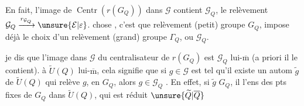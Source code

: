 En fait, l'image de $\operatorname{Centr}(r(G_Q))$ dans $\mathcal G$ contient $\mathcal G_Q$,    le relèvement $\mathcal G_Q\xrightarrow{r_{\mathcal G_Q}}\unsure{\mathcal E|\varepsilon}$.
 chose , c'est que   relèvement  (petit) groupe $G_Q$, impose déjà le choix d'un relèvement  (grand) groupe $\Gamma_Q$, ou $\mathcal G_Q$.

 je dis que l'image dans $\mathcal G$ du centralisateur  de $r(G_Q)$ est $\mathcal G_Q$ lui-$\overline{\mathrm m}$ (a priori il le contient).
 à $\widetilde U(Q)$ lui-$\overline{\mathrm m}$, cela signifie que  si $g\in\mathcal G$ est tel qu'il existe un autom $\widetilde g$ de $\widetilde U(Q)$ qui relève $g$, en     $G_Q$, alors $g\in\mathcal G_Q$ . En effet, si $\widetilde g$    $G_Q$, il  l'ens des pts fixes de $G_Q$ dans $\widetilde U(Q)$, qui est réduit   $\unsure{\widetilde Q|\overline Q}$
